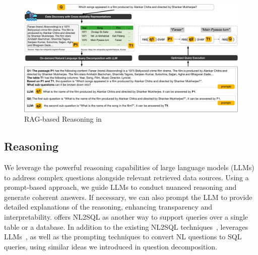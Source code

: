 \begin{figure}[t!]
\begin{center}
\includegraphics[width=\textwidth]{submissions/Nan2024/figs/reasoning.pdf}
\vspace{-2em}
\caption{RAG-based Reasoning in \sys}
\label{fig:reasoning}
\end{center}
\vspace{-1em}
\end{figure}





\subsection{Reasoning}

We leverage the powerful reasoning capabilities of large language models (LLMs) to address complex questions alongside relevant retrieved data sources. Using a prompt-based approach, we guide LLMs to conduct nuanced reasoning and generate coherent answers. If necessary, we can also prompt the LLM to provide detailed explanations of the reasoning, enhancing transparency and interpretability.
\sys offers NL2SQL as another way to support queries over a single table or a database.
In addition to the existing NL2SQL techniques~\cite{pasta}, \sys leverages LLMs~\cite{10.14778/3681954.3682003}, as well as the prompting techniques to convert NL questions to SQL queries, using similar ideas we introduced in question decomposition.



